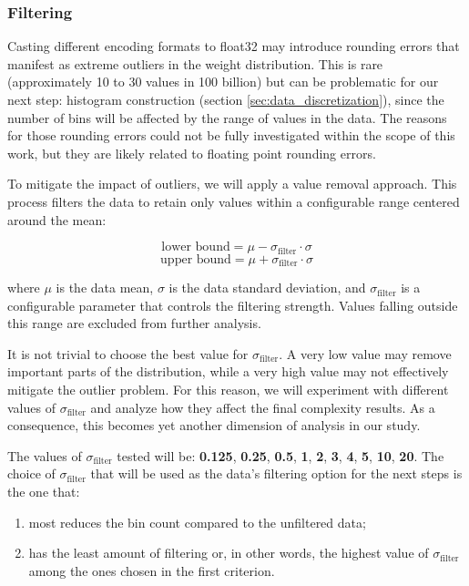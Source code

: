     \subsubsection{Filtering}

        Casting different encoding formats to float32 may introduce rounding errors that manifest as extreme outliers in the weight distribution. This is rare (approximately 10 to 30 values in 100 billion) but can be problematic for our next step: histogram construction (section \ref{sec:data_discretization}), since the number of bins will be affected by the range of values in the data. The reasons for those rounding errors could not be fully investigated within the scope of this work, but they are likely related to floating point rounding errors.

        To mitigate the impact of outliers, we will apply a value removal approach. This process filters the data to retain only values within a configurable range centered around the mean:

        \[ \text{lower bound} = \mu - \sigma_{\text{filter}} \cdot \sigma \]
        \[ \text{upper bound} = \mu + \sigma_{\text{filter}} \cdot \sigma \]

        where \( \mu \) is the data mean, \( \sigma \) is the data standard deviation, and \( \sigma_{\text{filter}} \) is a configurable parameter that controls the filtering strength. Values falling outside this range are excluded from further analysis. 

        It is not trivial to choose the best value for \( \sigma_{\text{filter}} \). A very low value may remove important parts of the distribution, while a very high value may not effectively mitigate the outlier problem. For this reason, we will experiment with different values of \( \sigma_{\text{filter}} \) and analyze how they affect the final complexity results. As a consequence, this becomes yet another dimension of analysis in our study.

        The values of \( \sigma_{\text{filter}} \) tested will be: \textbf{0.125}, \textbf{0.25}, \textbf{0.5}, \textbf{1}, \textbf{2}, \textbf{3}, \textbf{4}, \textbf{5}, \textbf{10}, \textbf{20}. The choice of \( \sigma_{\text{filter}} \) that will be used as the data's filtering option for the next steps is the one that: 
        \begin{enumerate}
            \item most reduces the bin count compared to the unfiltered data; 
            \item has the least amount of filtering or, in other words, the highest value of \( \sigma_{\text{filter}} \) among the ones chosen in the first criterion.
        \end{enumerate}

